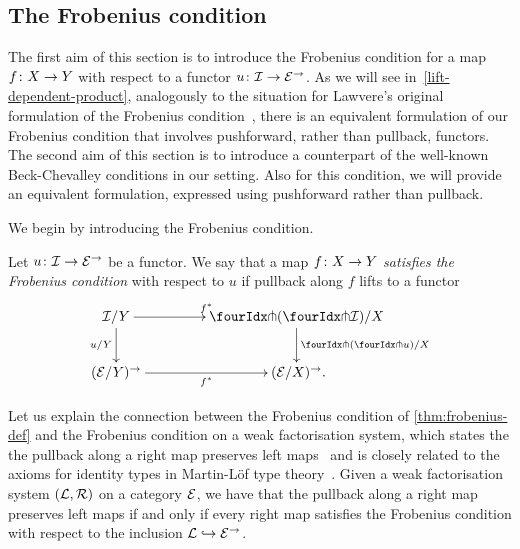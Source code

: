 \documentclass[reqno,10pt,a4paper,oneside]{amsart}
\begin{document}
\subsection*{The Frobenius condition}
The first aim of this section is to introduce the Frobenius condition for a map $f \co X \to Y$ with respect to a functor $u \co \cal{I} \to \cal{E}^\to$.
As we will see in~\cref{lift-dependent-product}, analogously to the situation for Lawvere's original formulation of the Frobenius condition~\cite{lawvere-equality}, there is an equivalent formulation of our Frobenius condition that involves pushforward, rather than pullback, functors.
The second aim of this section is to introduce a counterpart of the well-known Beck-Chevalley conditions in our setting.
Also for this condition, we will provide an equivalent formulation, expressed using pushforward rather than pullback.

\medskip

We begin by introducing the Frobenius condition.

\begin{definition} \label{thm:frobenius-def}
Let $u \co \cal{I} \to \cal{E}^\to$ be a functor.
We say that a map $f \co X \to Y$ \emph{satisfies the Frobenius condition} with respect to $u$ if pullback along $f$ lifts to a functor
\[
\xymatrix@C=1.5cm{
  \cal{I}/Y
  \ar[r]^{f^*}
  \ar[d]_{u/Y}
&
  \liftl{ ( \liftr{\cal{I}} )}/X
  \ar[d]^{\liftl{(\liftr{u})/X}}
\\
  (\catE/Y)^\to \ar[r]_{f^*}
&
  (\catE/X)^\to \rlap{.}
}
\]
\end{definition}

Let us explain the connection between the Frobenius condition of \cref{thm:frobenius-def} and the Frobenius condition on a weak factorisation system, which states the the pullback along a right map preserves left maps~\cite{garner:types-omega-groupoids,garner:topological-simplicial} and is closely related to the axioms for identity types in Martin-L\"of type theory~\cite{gambino-garner:idtypewfs}.
Given a weak factorisation system $(\cal{L}, \cal{R})$ on a category $\catE$, we have that the pullback along a right map preserves left maps if and only if every right map satisfies the Frobenius condition with respect to the inclusion $\cal{L} \hookrightarrow \cal{E}^\to$.
\end{document}
